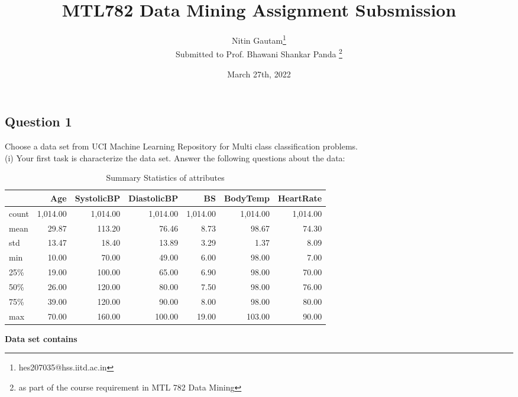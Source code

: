 \documentclass[12pt, letter]{article}
\title{\textbf{MTL782 Data Mining Assignment Subsmission}}
\author{Nitin Gautam\footnote{hes207035@hss.iitd.ac.in} \hspace{+3mm} \\Submitted to Prof. Bhawani Shankar Panda \footnote{as part of the course requirement in MTL 782 Data Mining}}
\date{March 27th, 2022}
\begin{document}
\pagebreak

\subsection*{Question 1}

\noindent
Choose a data set from UCI Machine Learning Repository for Multi class classification problems. \\ 

\noindent
(i) Your first task is characterize the data set. Answer the following questions about the data:

\begin{table}[h]
\centering
\caption{Summary Statistics of attributes}
\label{sum_stats}
\begin{tabular}{lrrrrrr}
\hline
\toprule
{} &      Age &  SystolicBP &  DiastolicBP &       BS &  BodyTemp &  HeartRate \\
\hline
\midrule
count & 1,014.00 &    1,014.00 &     1,014.00 & 1,014.00 &  1,014.00 &   1,014.00 \\
mean  &    29.87 &      113.20 &        76.46 &     8.73 &     98.67 &      74.30 \\
std   &    13.47 &       18.40 &        13.89 &     3.29 &      1.37 &       8.09 \\
min   &    10.00 &       70.00 &        49.00 &     6.00 &     98.00 &       7.00 \\
25\%   &    19.00 &      100.00 &        65.00 &     6.90 &     98.00 &      70.00 \\
50\%   &    26.00 &      120.00 &        80.00 &     7.50 &     98.00 &      76.00 \\
75\%   &    39.00 &      120.00 &        90.00 &     8.00 &     98.00 &      80.00 \\
max   &    70.00 &      160.00 &       100.00 &    19.00 &    103.00 &      90.00 \\
\hline
\end{tabular}
\end{table}

\textbf{Data set contains}
\end{document}
